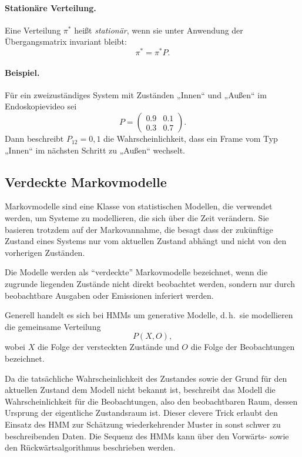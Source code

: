 \paragraph{Stationäre Verteilung.}
Eine Verteilung $\pi^*$ heißt \emph{stationär}, wenn sie unter Anwendung der Übergangsmatrix invariant bleibt:
\begin{equation}
\pi^* = \pi^* P.
\end{equation}

\paragraph{Beispiel.}
Für ein zweizuständiges System mit Zuständen „Innen“ und „Außen“ im Endoskopievideo sei
\[
  P = \begin{pmatrix}
    0.9 & 0.1 \\
    0.3 & 0.7
  \end{pmatrix}.
\]
Dann beschreibt $P_{12} = 0{,}1$ die Wahrscheinlichkeit, dass ein Frame vom Typ „Innen“ im nächsten Schritt zu „Außen“ wechselt.

\subsection{Verdeckte Markovmodelle}

Markovmodelle sind eine Klasse von statistischen Modellen, die verwendet werden, um Systeme zu modellieren, die sich über die Zeit verändern.
Sie basieren trotzdem auf der Markovannahme, die besagt dass der zukünftige Zustand eines Systems nur vom aktuellen Zustand abhängt und nicht von den vorherigen Zuständen. 

Die Modelle werden als \enquote{verdeckte} Markovmodelle bezeichnet, wenn die zugrunde liegenden Zustände nicht direkt beobachtet werden, sondern nur durch beobachtbare Ausgaben oder Emissionen inferiert werden.

Generell handelt es sich bei HMMs um generative Modelle, d.\,h.\ sie modellieren die gemeinsame Verteilung
\[
  P(X, O),
\]
wobei $X$ die Folge der versteckten Zustände und $O$ die Folge der Beobachtungen bezeichnet.

Da die tatsächliche Wahrscheinlichkeit des Zustandes sowie der Grund für den aktuellen Zustand dem Modell nicht bekannt ist, beschreibt das Modell die Wahrscheinlichkeit für die Beobachtungen, also den beobachtbaren Raum, dessen Ursprung der eigentliche Zustandsraum ist. Dieser clevere Trick erlaubt den Einsatz des HMM zur Schätzung wiederkehrender Muster in sonst schwer zu beschreibenden Daten. Die Sequenz des HMMs kann über den Vorwärts- sowie den Rückwärtsalgorithmus beschrieben werden.

